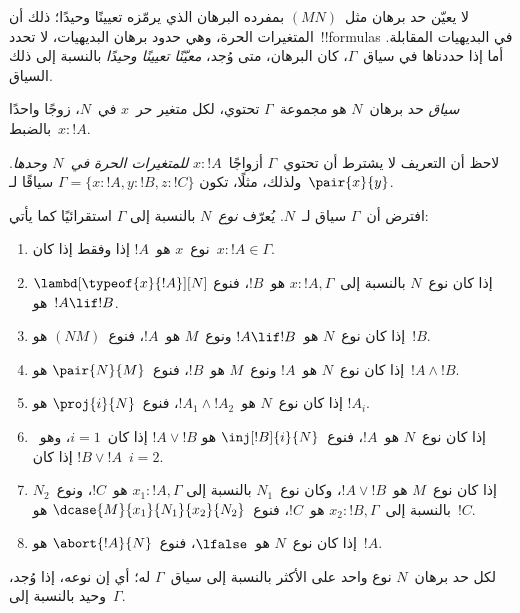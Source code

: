 \documentclass[../../../include/open-logic-section]{subfiles}
\begin{document}


لا يعيّن حد برهان مثل~$(MN)$ بمفرده البرهان الذي يرمّزه تعيينًا وحيدًا؛
ذلك أن المتغيرات الحرة، وهي حدود برهان البديهيات، لا تحدد~!!{formula}s في
البديهيات المقابلة. أما إذا حددناها في سياق~$\Gamma$، كان البرهان، متى
وُجد، \emph{معيّنًا تعيينًا وحيدًا} بالنسبة إلى ذلك السياق.

\begin{defn}
\emph{سياق} حد برهان~$N$ هو مجموعة~$\Gamma$ تحتوي، لكل متغير حر~$x$ في~$N$،
زوجًا واحدًا بالضبط~$x:!A$.
\end{defn}

لاحظ أن التعريف لا يشترط أن تحتوي~$\Gamma$ أزواجًا~$x:!A$
\emph{للمتغيرات الحرة في~$N$ وحدها}. ولذلك، مثلًا، تكون
$\Gamma=\{x:!A,y:!B,z:!C\}$ سياقًا لـ~$\pair{x}{y}$.

\begin{defn}
  افترض أن~$\Gamma$ سياق لـ~$N$. يُعرّف \emph{نوع}~$N$ بالنسبة إلى
  $\Gamma$ استقرائيًا كما يأتي:
  \begin{enumerate}
  \item نوع~$x$ هو~$!A$ إذا وفقط إذا كان~$x:!A\in\Gamma$.
  \item إذا كان نوع~$N$ بالنسبة إلى~$x:!A,\Gamma$ هو~$!B$، فنوع
    $\lambd[\typeof{x}{!A}][N]$ هو~$!A\lif !B$.
  \item إذا كان نوع~$N$ هو~$!A\lif !B$ ونوع~$M$ هو~$!A$، فنوع~$(NM)$
    هو~$!B$.
  \item إذا كان نوع~$N$ هو~$!A$ ونوع~$M$ هو~$!B$، فنوع~$\pair{N}{M}$
    هو~$!A\land !B$.
  \item إذا كان نوع~$N$ هو~$!A_1\land !A_2$، فنوع~$\proj{i}{N}$ هو
    $!A_i$.
  \item إذا كان نوع~$N$ هو~$!A$، فنوع~$\inj[!B]{i}{N}$ هو
    $!A\lor !B$ إذا كان~$i=1$، وهو~$!B\lor !A$ إذا كان~$i=2$.
  \item إذا كان نوع~$M$ هو~$!A\lor !B$، وكان نوع~$N_1$ بالنسبة إلى
    $x_1:!A,\Gamma$ هو~$!C$، ونوع~$N_2$ بالنسبة إلى~$x_2:!B,\Gamma$
    هو~$!C$، فنوع~$\dcase{M}{x_1}{N_1}{x_2}{N_2}$ هو~$!C$.
  \item إذا كان نوع~$N$ هو~$\lfalse$، فنوع~$\abort{!A}{N}$ هو~$!A$.
  \end{enumerate}
\end{defn}

\begin{prop}
لكل حد برهان~$N$ نوع واحد على الأكثر بالنسبة إلى سياق~$\Gamma$ له؛ أي إن
نوعه، إذا وُجد، وحيد بالنسبة إلى~$\Gamma$.
\end{prop}
\end{document}
